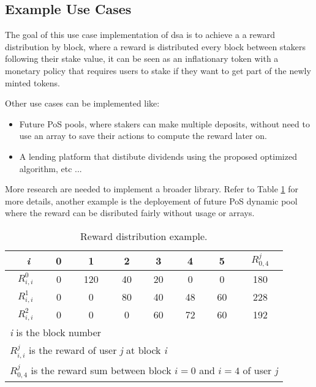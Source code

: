 \documentclass[a4paper]{article}
\begin{document}
\subsection{Example Use Cases}
\noindent
The goal of this use case implementation of \acrshort{dsa} is to achieve a a reward distribution by block, where a reward is distributed every block between stakers following their stake value, it can be seen as an inflationary token with a monetary policy that requires users to stake if they want to get part of the newly minted tokens.\par
\noindent
Other use cases can be implemented like:
\begin{itemize}
  \setlength\itemsep{0.1em}
  \item Future PoS pools, where stakers can make multiple deposits, without need to use an array to save their actions to compute the reward later on.
  \item A lending platform that distibute dividends using the proposed optimized algorithm, etc ...
\end{itemize}\par
\noindent
More research are needed to implement a broader library. Refer to Table \ref{tab:table_reward_example} for more details, another example is the deployement of future PoS dynamic pool where the reward can be disributed fairly without usage or arrays.\par
\begin{table}[h!]
  \begin{center}
    \caption{Reward distribution example.}
    \label{tab:table_reward_example}
    \begin{tabular}{ c | c c c c c c || c }
      \hline \
  	  \textit{i} & 0 & 1 &  2 & 3 & 4 & 5 & $\mathit{R_{0,4}^j}$ \\
  	  \hline
      $R_{i,i}^0$ & 0 & 120 & 40 & 20 & 0 & 0 & 180 \\ 
      $R_{i,i}^1$ & 0 & 0 & 80 & 40 & 48 & 60 & 228 \\ 
      $R_{i,i}^2$ & 0 & 0 & 0 & 60 & 72 & 60 & 192 \\
      \hline
      \multicolumn{8}{l}{\footnotesize \textit{i} is the block number}\\
      \multicolumn{8}{l}{\footnotesize $R_{i,i}^j$ is the reward of user \textit{j} at block \textit{i}}\\
      \multicolumn{8}{l}{\footnotesize $R_{0,4}^j$ is the reward sum between block $i=0$ and $i=4$ of user \textit{j} }\\
    \end{tabular}
  \end{center}
\end{table}
\end{document}
